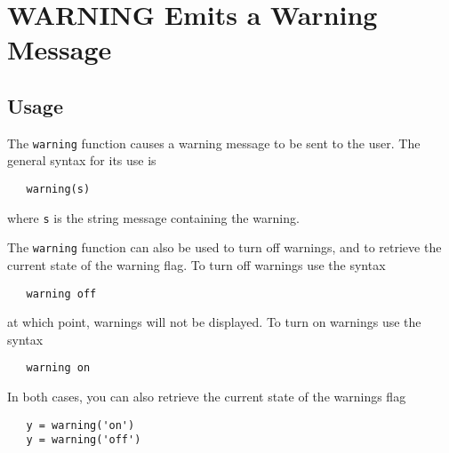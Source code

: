 \section{WARNING Emits a Warning Message}

\subsection{Usage}

The \verb|warning| function causes a warning message to be
sent to the user.  The general syntax for its use is
\begin{verbatim}
   warning(s)
\end{verbatim}
where \verb|s| is the string message containing the warning.

The \verb|warning| function can also be used to turn off warnings, and to
retrieve the current state of the warning flag.  To turn off warnings
use the syntax
\begin{verbatim}
   warning off
\end{verbatim}
at which point, warnings will not be displayed.  To turn on warnings
use the syntax
\begin{verbatim}
   warning on
\end{verbatim}
In both cases, you can also retrieve the current state of the warnings
flag
\begin{verbatim}
   y = warning('on')
   y = warning('off')
\end{verbatim}

